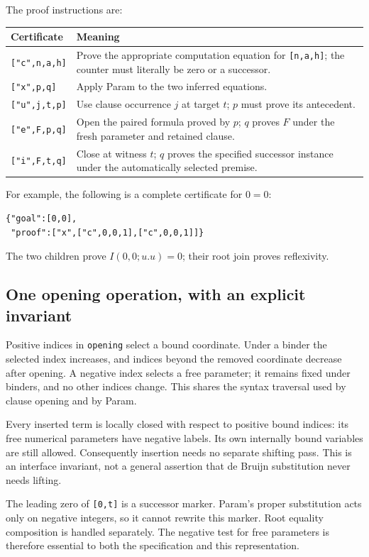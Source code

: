 The proof instructions are:
\begin{center}
\begin{tabularx}{\linewidth}{lX}
\toprule
Certificate & Meaning\\
\midrule
\texttt{["c",n,a,h]} & Prove the appropriate computation equation for
  \texttt{[n,a,h]}; the counter must literally be zero or a successor.\\
\texttt{["x",p,q]} & Apply Param to the two inferred equations.\\
\texttt{["u",j,t,p]} & Use clause occurrence $j$ at target $t$;
  $p$ must prove its antecedent.\\
\texttt{["e",F,p,q]} & Open the paired formula proved by $p$;
  $q$ proves $F$ under the fresh parameter and retained clause.\\
\texttt{["i",F,t,q]} & Close at witness $t$; $q$ proves the specified
  successor instance under the automatically selected premise.\\
\bottomrule
\end{tabularx}
\end{center}

For example, the following is a complete certificate for $0=0$:
\begin{lstlisting}[language={}]
{"goal":[0,0],
 "proof":["x",["c",0,0,1],["c",0,0,1]]}
\end{lstlisting}
The two children prove $I(0,0;u.u)=0$; their root join proves reflexivity.

\subsection{One opening operation, with an explicit invariant}

Positive indices in \texttt{opening} select a bound coordinate. Under a
binder the selected index increases, and indices beyond the removed
coordinate decrease after opening. A negative index selects a free
parameter; it remains fixed under binders, and no other indices change.
This shares the syntax traversal used by clause opening and by Param.

Every inserted term is locally closed with respect to positive bound
indices: its free numerical parameters have negative labels. Its own
internally bound variables are still allowed. Consequently insertion
needs no separate shifting pass. This is an interface invariant, not a
general assertion that de Bruijn substitution never needs lifting.

The leading zero of \texttt{[0,t]} is a successor marker. Param's proper
substitution acts only on negative integers, so it cannot rewrite this
marker. Root equality composition is handled separately. The negative
test for free parameters is therefore essential to both the specification
and this representation.

